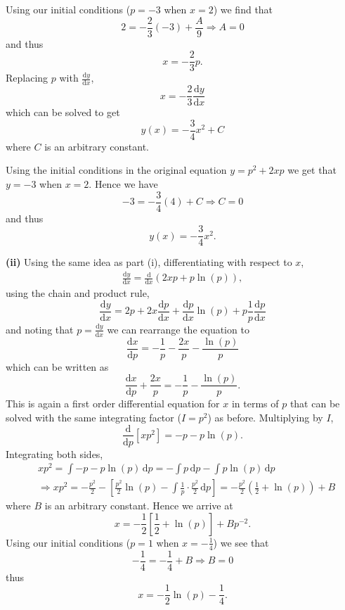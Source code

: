 \documentclass{article}
\begin{document}
\quad Using our initial conditions ($p=-3$ when $x=2$) we find that
\[
2 = -\frac{2}{3}(-3)+\frac{A}{9} \Rightarrow A = 0
\]
and thus
\[
x = -\frac{2}{3}p.
\]
Replacing $p$ with $\frac{\mathrm{d}y}{\mathrm{d}x}$,
\begin{equation*}
x = -\frac{2}{3}\frac{\mathrm{d}y}{\mathrm{d}x}
\end{equation*}
which can be solved to get
\begin{equation*}
y(x) = -\frac{3}{4}x^2 + C
\end{equation*}
where $C$ is an arbitrary constant.\par
\quad Using the initial conditions in the original equation $y=p^2+2xp$ we get that $y=-3$ when $x=2$. Hence we have
\[
-3 = -\frac{3}{4}(4) + C \Rightarrow C = 0
\]
and thus
\[
y(x) = -\frac{3}{4}x^2.
\]

\vspace{0.5cm}

\textbf{(ii)} Using the same idea as part (i), differentiating with respect to $x$,
\begin{align*}
\frac{\mathrm{d}y}{\mathrm{d}x} = \frac{\mathrm{d}}{\mathrm{d}x}(2xp+p\ln(p)),
\end{align*}
using the chain and product rule,
\[
\frac{\mathrm{d}y}{\mathrm{d}x} = 2p + 2x\frac{\mathrm{d}p}{\mathrm{d}x} + \frac{\mathrm{d}p}{\mathrm{d}x}\ln(p) + p \frac{1}{p}\frac{\mathrm{d}p}{\mathrm{d}x}
\]
and noting that $p = \frac{\mathrm{d}y}{\mathrm{d}x}$ we can rearrange the equation to 
\[
\frac{\mathrm{d}x}{\mathrm{d}p} = -\frac{1}{p} -\frac{2x}{p} - \frac{\ln(p)}{p}
\]
which can be written as
\[
\frac{\mathrm{d}x}{\mathrm{d}p} + \frac{2x}{p} = -\frac{1}{p} - \frac{\ln(p)}{p}.
\]
This is again a first order differential equation for $x$ in terms of $p$ that can be solved with the same integrating factor ($I = p^2$) as before. Multiplying by $I$,
\[
\frac{\mathrm{d}}{\mathrm{d}p}[xp^2] = -p-p\ln(p).
\]
Integrating both sides,
\begin{align*}
& xp^2 = \int -p-p\ln(p) \,\mathrm{d}p = - \int p \,\mathrm{d}p - \int p\ln(p) \,\mathrm{d}p \\
& \Rightarrow xp^2 = -\frac{p^2}{2} - \left[\frac{p^2}{2}\ln(p) - \int \frac{1}{p} \cdot \frac{p^2}{2} \,\mathrm{d}p\right] = -\frac{p^2}{2}\left(\frac{1}{2}+\ln(p)\right) + B
\end{align*}
where $B$ is an arbitrary constant. Hence we arrive at
\[
x = -\frac{1}{2}\left[\frac{1}{2} + \ln(p) \right] + Bp^{-2}.
\]
Using our initial conditions ($p=1$ when $x= -\frac{1}{4}$) we see that
\[
-\frac{1}{4} = -\frac{1}{4} + B \Rightarrow B=0
\]
thus
\[
x = -\frac{1}{2}\ln(p) - \frac{1}{4}.
\]
\end{document}

